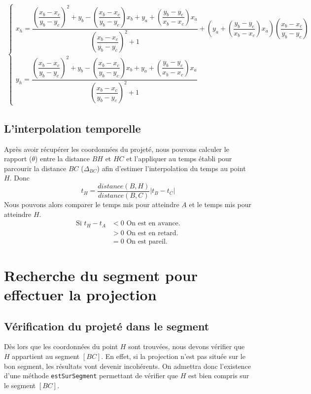 \begin{align}
	\begin{cases}
		 x_h = \dfrac{\left( \dfrac{x_b - x_c}{y_b - y_c}\right)^2 + y_b - \left( \dfrac{x_b - x_c}{y_b - y_c}\right) x_b + y_a + \left( \dfrac{y_b - y_c}{x_b - x_c}\right) x_a}{\left( \dfrac{x_b - x_c}{y_b - y_c}\right)^2 + 1} + \left( y_a + \left( \dfrac{y_b - y_c}{x_b - x_c}\right) x_a\right) \left( \dfrac{x_b - x_c}{y_b - y_c}\right)  \\
    	 y_h = \dfrac{\left( \dfrac{x_b - x_c}{y_b - y_c}\right)^2 + y_b - \left( \dfrac{x_b - x_c}{y_b - y_c}\right) x_b + y_a + \left( \dfrac{y_b - y_c}{x_b - x_c}\right) x_a}{\left( \dfrac{x_b - x_c}{y_b - y_c}\right)^2 + 1}
	\end{cases}
\end{align}

\subsection{L'interpolation temporelle}
Après avoir récupérer les coordonnées du projeté, nous pouvons calculer le rapport ($\theta$) entre la distance $BH$ et $HC$ et l'appliquer au temps établi pour parcourir la distance $BC$ ($\Delta_{BC}$) afin d'estimer l'interpolation du temps au point $H$. Donc
\[
	t_H = \frac{distance(B,H)}{distance(B,C)}| t_B - t_C | 
\]
Nous pouvons alors comparer le temps mis pour atteindre $A$ et le temps mis pour atteindre $H$.
\begin{align}
\mbox{Si } t_H - t_A &<0 \mbox{ On est en avance.} \\
			&>0 \mbox{ On est en retard.} \\
			&=0 \mbox{ On est pareil.}
\end{align}

\section{Recherche du segment pour effectuer la projection}
\subsection{Vérification du projeté dans le segment}
Dès lors que les coordonnées du point $H$ sont trouvées, nous devons vérifier que $H$ appartient au segment $[BC]$. En effet, si la projection n'est pas située sur le bon segment, les résultats vont devenir incohérents. On admettra donc l'existence d'une méthode \verb!estSurSegment! permettant de vérifier que $H$ est bien compris sur le segment $[BC]$.

